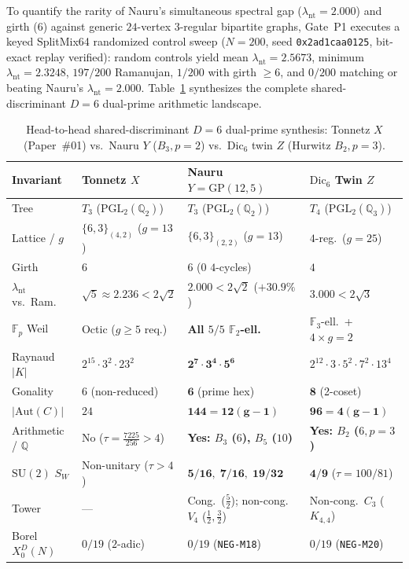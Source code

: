 \documentclass[11pt]{amsart}
\numberwithin{equation}{section}
\theoremstyle{plain}
\theoremstyle{definition}\newtheorem{definition}[theorem]{Definition}
\theoremstyle{remark}\newtheorem{remark}[theorem]{Remark}
\newcommand{\Q}{\mathbb{Q}}
\newcommand{\F}{\mathbb{F}}
\newcommand{\PGL}{\mathrm{PGL}}
\newcommand{\SU}{\mathrm{SU}}
\newcommand{\Aut}{\mathrm{Aut}}
\newcommand{\GP}{\mathrm{GP}}
\begin{document}
To quantify the rarity of Nauru's simultaneous spectral gap ($\lambda_{\mathrm{nt}}=2.000$) and girth ($6$) against generic $24$-vertex $3$-regular bipartite graphs, Gate~P1 executes a keyed SplitMix64 randomized control sweep ($N=200$, seed \texttt{0x2ad1caa0125}, bit-exact replay verified): random controls yield mean $\lambda_{\mathrm{nt}}=2.5673$, minimum $\lambda_{\mathrm{nt}}=2.3248$, $197/200$ Ramanujan, $1/200$ with girth $\ge 6$, and \textbf{$0/200$} matching or beating Nauru's $\lambda_{\mathrm{nt}}=2.000$. Table~\ref{tab:comparison} synthesizes the complete shared-discriminant $D=6$ dual-prime arithmetic landscape.

\begin{table}[t]
\centering\scriptsize\setlength{\tabcolsep}{2.0pt}
\caption{Head-to-head shared-discriminant $D{=}6$ dual-prime synthesis: Tonnetz $X$ (Paper~\#01) vs.\ Nauru $Y$ ($B_3, p{=}2$) vs.\ $\mathrm{Dic}_6$ twin $Z$ (Hurwitz $B_2, p{=}3$).}
\label{tab:comparison}
\begin{tabular}{llll}\toprule
Invariant & Tonnetz $X$ \cite{ergentics2026pc} & Nauru $Y=\GP(12,5)$ & $\mathrm{Dic}_6$ Twin $Z$ \\\midrule
Tree & $T_3$ ($\PGL_2(\Q_2)$) & $T_3$ ($\PGL_2(\Q_2)$) & $T_4$ ($\PGL_2(\Q_3)$) \\
Lattice / $g$ & $\{6,3\}_{(4,2)}$ ($g{=}13$) & $\{6,3\}_{(2,2)}$ ($g{=}13$) & $4$-reg.\ ($g{=}25$) \\
Girth & $6$ & $6$ ($0$ $4$-cycles) & $4$ \\
$\lambda_{\mathrm{nt}}$ vs.\ Ram. & $\sqrt{5}\approx 2.236 < 2\sqrt{2}$ & $\mathbf{2.000}<2\sqrt{2}$ ($+30.9\%$) & $\mathbf{3.000} < 2\sqrt{3}$ \\
$\F_p$ Weil & Octic ($g\ge 5$ req.) & \textbf{All $5/5$ $\F_2$-ell.} & $\F_3$-ell.\ + $4{\times}g{=}2$ \\
Raynaud $|K|$ & $2^{15}\cdot 3^2\cdot 23^2$ & $\mathbf{2^7\cdot 3^4\cdot 5^6}$ & $2^{12}\cdot 3\cdot 5^2\cdot 7^2\cdot 13^4$ \\
Gonality & $6$ (non-reduced) & $\mathbf{6}$ (prime hex) & $\mathbf{8}$ (2-coset) \\
$|\Aut(C)|$ & $24$ & $\mathbf{144=12(g-1)}$ & $\mathbf{96=4(g-1)}$ \\
Arithmetic / $\Q$ & No ($\tau{=}\frac{7225}{256}{>}4$) & \textbf{Yes: $B_3$ ($6$), $B_5$ ($10$)} & \textbf{Yes: $B_2$ ($6, p{=}3$)} \\
$\SU(2)$ $S_W$ & Non-unitary ($\tau{>}4$) & $\mathbf{5/16,\; 7/16,\; 19/32}$ & $\mathbf{4/9}$ ($\tau{=}100/81$) \\
Tower & --- & Cong.\ ($\tfrac52$); non-cong.\ $V_4$ ($\tfrac12,\tfrac32$) & Non-cong.\ $C_3$ ($K_{4,4}$) \\
Borel $X_0^D(N)$ & $0/19$ ($2$-adic) & $0/19$ (\texttt{NEG-M18}) & $0/19$ (\texttt{NEG-M20}) \\\bottomrule
\end{tabular}
\end{table}
\end{document}
